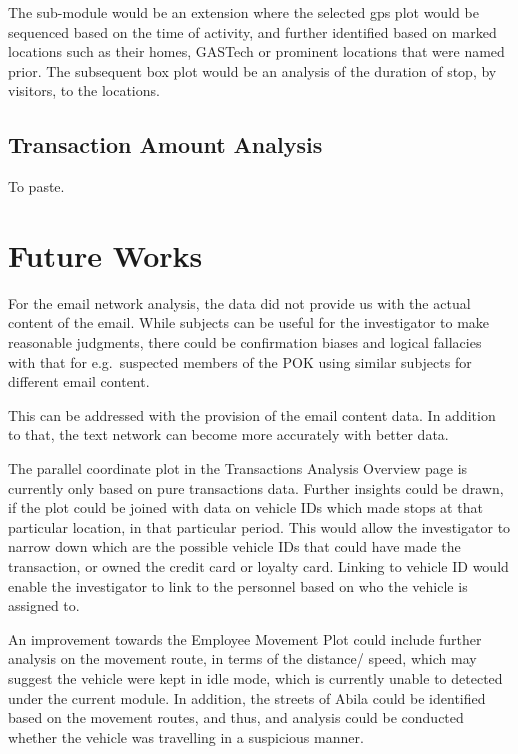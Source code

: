 \documentclass{acm_proc_article-sp}
\begin{document}
The sub-module would be an extension where the selected gps plot would
be sequenced based on the time of activity, and further identified based
on marked locations such as their homes, GASTech or prominent locations
that were named prior. The subsequent box plot would be an analysis of
the duration of stop, by visitors, to the locations.

\hypertarget{transaction-amount-analysis}{%
\subsection{Transaction Amount
Analysis}\label{transaction-amount-analysis}}

To paste.

\hypertarget{future-works}{%
\section{Future Works}\label{future-works}}

For the email network analysis, the data did not provide us with the
actual content of the email. While subjects can be useful for the
investigator to make reasonable judgments, there could be confirmation
biases and logical fallacies with that for e.g.~suspected members of the
POK using similar subjects for different email content.

This can be addressed with the provision of the email content data. In
addition to that, the text network can become more accurately with
better data.

The parallel coordinate plot in the Transactions Analysis Overview page
is currently only based on pure transactions data. Further insights
could be drawn, if the plot could be joined with data on vehicle IDs
which made stops at that particular location, in that particular period.
This would allow the investigator to narrow down which are the possible
vehicle IDs that could have made the transaction, or owned the credit
card or loyalty card. Linking to vehicle ID would enable the
investigator to link to the personnel based on who the vehicle is
assigned to.

An improvement towards the Employee Movement Plot could include further
analysis on the movement route, in terms of the distance/ speed, which
may suggest the vehicle were kept in idle mode, which is currently
unable to detected under the current module. In addition, the streets of
Abila could be identified based on the movement routes, and thus, and
analysis could be conducted whether the vehicle was travelling in a
suspicious manner.
\end{document}
